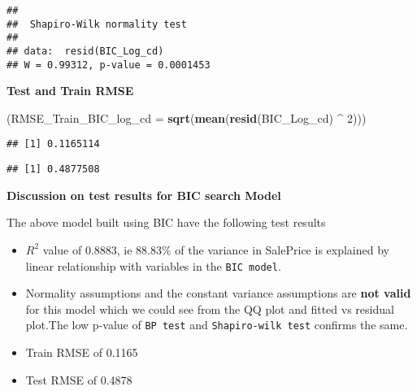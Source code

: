\documentclass[]{article}
\newenvironment{Shaded}{\begin{snugshade}}{\end{snugshade}}
\newcommand{\KeywordTok}[1]{\textcolor[rgb]{0.13,0.29,0.53}{\textbf{#1}}}
\newcommand{\DataTypeTok}[1]{\textcolor[rgb]{0.13,0.29,0.53}{#1}}
\newcommand{\DecValTok}[1]{\textcolor[rgb]{0.00,0.00,0.81}{#1}}
\newcommand{\StringTok}[1]{\textcolor[rgb]{0.31,0.60,0.02}{#1}}
\newcommand{\OperatorTok}[1]{\textcolor[rgb]{0.81,0.36,0.00}{\textbf{#1}}}
\newcommand{\NormalTok}[1]{#1}
\begin{document}
\begin{verbatim}
## 
##  Shapiro-Wilk normality test
## 
## data:  resid(BIC_Log_cd)
## W = 0.99312, p-value = 0.0001453
\end{verbatim}

\textbf{Test and Train RMSE}

\begin{Shaded}
\begin{Highlighting}[]
\NormalTok{(}\DataTypeTok{RMSE_Train_BIC_log_cd =} \KeywordTok{sqrt}\NormalTok{(}\KeywordTok{mean}\NormalTok{(}\KeywordTok{resid}\NormalTok{(BIC_Log_cd) }\OperatorTok{^}\StringTok{ }\DecValTok{2}\NormalTok{)))}
\end{Highlighting}
\end{Shaded}

\begin{verbatim}
## [1] 0.1165114
\end{verbatim}

\begin{Shaded}
\end{Shaded}

\begin{verbatim}
## [1] 0.4877508
\end{verbatim}

\textbf{Discussion on test results for BIC search Model}

The above model built using BIC have the following test results

\begin{itemize}
\item
  \(R^2\) value of 0.8883, ie 88.83\% of the variance in SalePrice is
  explained by linear relationship with variables in the
  \texttt{BIC\ model}.
\item
  Normality assumptions and the constant variance assumptions are
  \textbf{not valid} for this model which we could see from the QQ plot
  and fitted vs residual plot.The low p-value of \texttt{BP\ test} and
  \texttt{Shapiro-wilk\ test} confirms the same.
\item
  Train RMSE of 0.1165
\item
  Test RMSE of 0.4878
\end{itemize}
\end{document}
